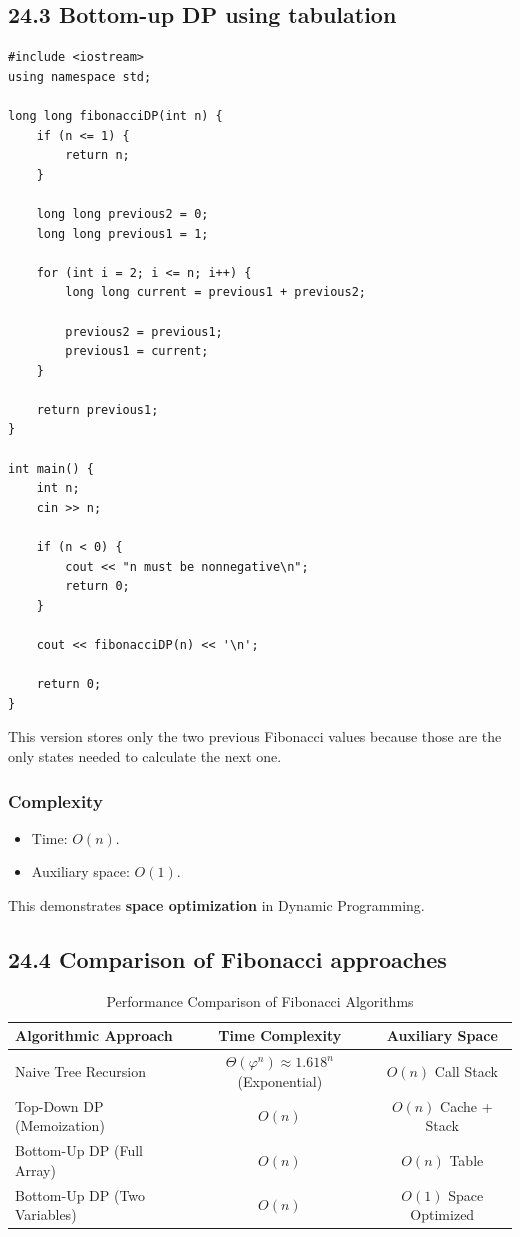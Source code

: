 \subsection{24.3 Bottom-up DP using tabulation}

\begin{lstlisting}[style=cppstyle]
#include <iostream>
using namespace std;

long long fibonacciDP(int n) {
    if (n <= 1) {
        return n;
    }

    long long previous2 = 0;
    long long previous1 = 1;

    for (int i = 2; i <= n; i++) {
        long long current = previous1 + previous2;

        previous2 = previous1;
        previous1 = current;
    }

    return previous1;
}

int main() {
    int n;
    cin >> n;

    if (n < 0) {
        cout << "n must be nonnegative\n";
        return 0;
    }

    cout << fibonacciDP(n) << '\n';

    return 0;
}
\end{lstlisting}

This version stores only the two previous Fibonacci values because those are the only states needed to calculate the next one.

\subsubsection{Complexity}

\begin{itemize}
    \item Time: $O(n)$.
    \item Auxiliary space: $O(1)$.
\end{itemize}

This demonstrates \textbf{space optimization} in Dynamic Programming.

\subsection{24.4 Comparison of Fibonacci approaches}

\begin{table}[htbp]
\centering
\caption{Performance Comparison of Fibonacci Algorithms}
\label{tab:fibonacci_comparison}
\begin{tabularx}{\textwidth}{X c c}
\toprule
\textbf{Algorithmic Approach} & \textbf{Time Complexity} & \textbf{Auxiliary Space} \\
\midrule
Naive Tree Recursion & $\Theta(\varphi^n) \approx 1.618^n$ (Exponential) & $O(n)$ Call Stack \\
Top-Down DP (Memoization) & $O(n)$ & $O(n)$ Cache + Stack \\
Bottom-Up DP (Full Array) & $O(n)$ & $O(n)$ Table \\
Bottom-Up DP (Two Variables) & $O(n)$ & $O(1)$ Space Optimized \\
\bottomrule
\end{tabularx}
\end{table}

